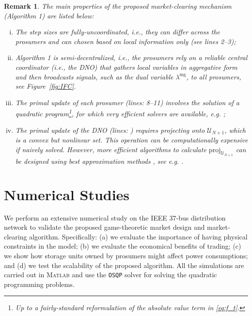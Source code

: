 \documentclass{IEEEtran}  %
\newtheorem{remark}{Remark}
\newcommand{\mc}{\mathcal}
\newcommand{\proj}{\mathrm{proj}}
\newcommand{\0}{\mathbf{0}}
\newcommand{\1}{\mathbf{1}}
\newcommand{\edit}[1]{\color{blue}{#1}\color{black}}
\newcommand{\note}[1]{\textcolor{blue}{\texttt{#1}}}
\begin{document}
\begin{remark} The main properties of the proposed market-clearing mechanism (Algorithm 1) are listed below:
\begin{enumerate}[(i)]

\item The step sizes are fully-uncoordinated, i.e., they can differ across the prosumers and can chosen based on local information only (see lines 2--3);

\item Algorithm 1 is semi-decentralized, i.e., the prosumers rely on a reliable central coordinator (i.e., the DNO) that gathers local variables in aggregative form and then broadcasts signals, such as the dual variable $\lambda^{\text{mg}}$, to all prosumers, see Figure~\ref{fig:IFC}.

\item The primal update of each prosumer (lines: 8--11) involves the solution of a quadratic program\footnote{Up to a fairly-standard reformulation of the absolute value term in \eqref{eq:f_t}.}, for which very efficient solvers are available, e.g. \cite{osqp};

\item \marginnote{\note{R4-10}} The primal update of the DNO (lines: \edit{28--31}) requires projecting onto $\mc U_{N+1}$, which is a convex but nonlinear set. This operation can be computationally expensive if naively solved. However, more efficient algorithms to calculate $\proj_{\mc U_{N+1}}$ can be designed using \textit{best approximation methods} \cite[\S~4.3]{bauschke2015projection}, see e.g. \cite[Appendix~2]{belgioioso2021operationally}.

\end{enumerate}
\end{remark}
\section{Numerical Studies}
\label{sub:case_std}
We perform an extensive numerical study on the IEEE 37-bus distribution network to validate the proposed game-theoretic market design and market-clearing algorithm. Specifically: (a) we evaluate the importance of having physical constraints in the model; (b) we evaluate the economical benefits of trading;  (c) we show how storage units owned by prosumers might affect power consumptions; and (d) we test the scalability of the proposed algorithm. All the simulations are carried out in \textsc{Matlab} and use the \texttt{OSQP} solver \cite{osqp} for solving the quadratic programming problems. 
\end{document}
